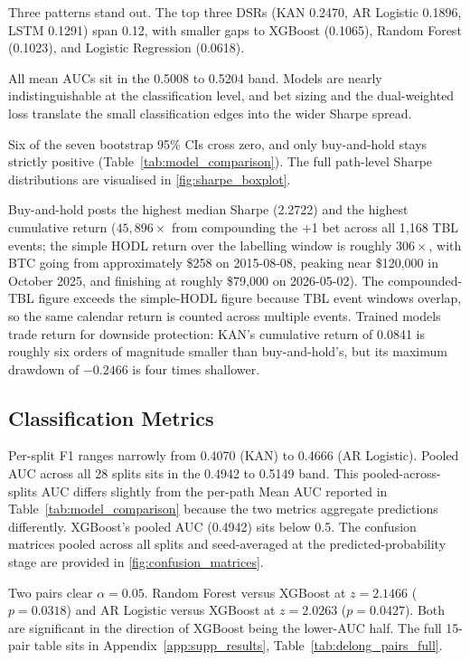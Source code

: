 Three patterns stand out. The top three DSRs (KAN 0.2470, AR Logistic 0.1896, LSTM 0.1291) span 0.12, with smaller gaps to XGBoost (0.1065), Random Forest (0.1023), and Logistic Regression (0.0618).

All mean AUCs sit in the 0.5008 to 0.5204 band. Models are nearly indistinguishable at the classification level, and bet sizing and the dual-weighted loss translate the small classification edges into the wider Sharpe spread.

Six of the seven bootstrap 95\% CIs cross zero, and only buy-and-hold stays strictly positive (Table~\ref{tab:model_comparison}). The full path-level Sharpe distributions are visualised in \label{ref:sharpe_boxplot_call}\autoref{fig:sharpe_boxplot}.

Buy-and-hold posts the highest median Sharpe (2.2722) and the highest cumulative return ($45{,}896\times$ from compounding the +1 bet across all 1,168 TBL events; the simple HODL return over the labelling window is roughly $306\times$, with BTC going from approximately \$258 on 2015-08-08, peaking near \$120,000 in October 2025, and finishing at roughly \$79,000 on 2026-05-02). The compounded-TBL figure exceeds the simple-HODL figure because TBL event windows overlap, so the same calendar return is counted across multiple events. Trained models trade return for downside protection: KAN's cumulative return of 0.0841 is roughly six orders of magnitude smaller than buy-and-hold's, but its maximum drawdown of $-0.2466$ is four times shallower.


\subsection{Classification Metrics}\label{subsec:results_classification}

Per-split F1 ranges narrowly from 0.4070 (KAN) to 0.4666 (AR Logistic). Pooled AUC across all 28 splits sits in the 0.4942 to 0.5149 band. This pooled-across-splits AUC differs slightly from the per-path Mean AUC reported in Table~\ref{tab:model_comparison} because the two metrics aggregate predictions differently. XGBoost's pooled AUC (0.4942) sits below 0.5. The confusion matrices pooled across all splits and seed-averaged at the predicted-probability stage are provided in \label{ref:confusion_matrices_call}\autoref{fig:confusion_matrices}.

Two pairs clear $\alpha = 0.05$. Random Forest versus XGBoost at $z = 2.1466$ ($p = 0.0318$) and AR Logistic versus XGBoost at $z = 2.0263$ ($p = 0.0427$). Both are significant in the direction of XGBoost being the lower-AUC half. The full 15-pair table sits in Appendix~\ref{app:supp_results}, \label{ref:delong_pairs_full_call}Table~\ref{tab:delong_pairs_full}.

